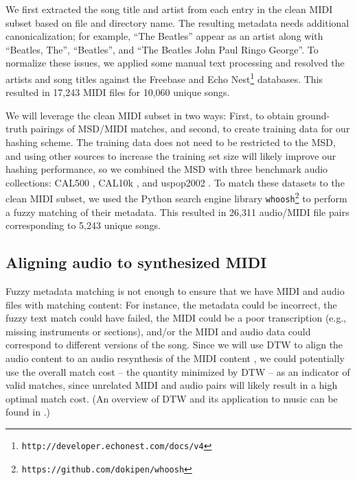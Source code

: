 \documentclass{article}
\begin{document}
We first extracted the song title and artist from each entry in the clean MIDI subset based on file and directory name.
The resulting metadata needs additional canonicalization; for example, ``The Beatles'' appear as an artist along with ``Beatles, The'', ``Beatles'', and ``The Beatles John Paul Ringo George''.
To normalize these issues, we applied some manual text processing and resolved the artists and song titles against the Freebase \cite{bollacker2008freebase} and Echo Nest\footnote{\texttt{http://developer.echonest.com/docs/v4}} databases.
This resulted in 17,243 MIDI files for 10,060 unique songs.

We will leverage the clean MIDI subset in two ways: First, to obtain ground-truth pairings of MSD/MIDI matches, and second, to create training data for our hashing scheme.  
The training data does not need to be restricted to the MSD, and using other sources to increase the training set size will likely improve our hashing performance, so we combined the MSD with three benchmark audio collections: CAL500 \cite{turnbull2007towards}, CAL10k \cite{tingle2010exploring}, and uspop2002 \cite{berenzweig2004large}.
To match these datasets to the clean MIDI subset, we used the Python search engine library \texttt{whoosh}\footnote{\texttt{https://github.com/dokipen/whoosh}} to perform a fuzzy matching of their metadata.
This resulted in 26,311 audio/MIDI file pairs corresponding to 5,243 unique songs.

\subsection{Aligning audio to synthesized MIDI}
\label{sec:alignment}

Fuzzy metadata matching is not enough to ensure that we have MIDI and audio files with matching content: For instance, the metadata could be incorrect, the fuzzy text match could have failed, the MIDI could be a poor transcription (e.g., missing instruments or sections), and/or the MIDI and audio data could correspond to different versions of the song.
Since we will use DTW to align the audio content to an audio resynthesis of the MIDI content \cite{turetsky2003ground, hu2003polyphonic,ewert2012towards}, we could potentially use the overall match cost -- the quantity minimized by DTW -- as an indicator of valid matches, since unrelated MIDI and audio pairs will likely result in a high optimal match cost.  (An overview of DTW and its application to music can be found in \cite{muller2007information}.)
\end{document}
